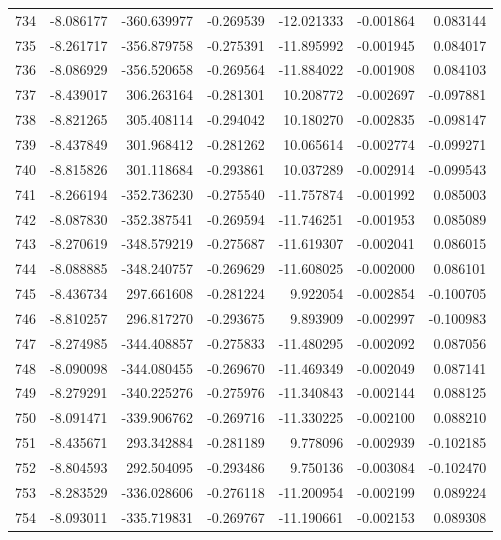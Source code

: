 \begin{tabular}{rrrrrrr}
 734 &  -8.086177 & -360.639977 & -0.269539 &  -12.021333 &   -0.001864 &  0.083144 \\
 735 &  -8.261717 & -356.879758 & -0.275391 &  -11.895992 &   -0.001945 &  0.084017 \\
 736 &  -8.086929 & -356.520658 & -0.269564 &  -11.884022 &   -0.001908 &  0.084103 \\
 737 &  -8.439017 &  306.263164 & -0.281301 &   10.208772 &   -0.002697 & -0.097881 \\
 738 &  -8.821265 &  305.408114 & -0.294042 &   10.180270 &   -0.002835 & -0.098147 \\
 739 &  -8.437849 &  301.968412 & -0.281262 &   10.065614 &   -0.002774 & -0.099271 \\
 740 &  -8.815826 &  301.118684 & -0.293861 &   10.037289 &   -0.002914 & -0.099543 \\
 741 &  -8.266194 & -352.736230 & -0.275540 &  -11.757874 &   -0.001992 &  0.085003 \\
 742 &  -8.087830 & -352.387541 & -0.269594 &  -11.746251 &   -0.001953 &  0.085089 \\
 743 &  -8.270619 & -348.579219 & -0.275687 &  -11.619307 &   -0.002041 &  0.086015 \\
 744 &  -8.088885 & -348.240757 & -0.269629 &  -11.608025 &   -0.002000 &  0.086101 \\
 745 &  -8.436734 &  297.661608 & -0.281224 &    9.922054 &   -0.002854 & -0.100705 \\
 746 &  -8.810257 &  296.817270 & -0.293675 &    9.893909 &   -0.002997 & -0.100983 \\
 747 &  -8.274985 & -344.408857 & -0.275833 &  -11.480295 &   -0.002092 &  0.087056 \\
 748 &  -8.090098 & -344.080455 & -0.269670 &  -11.469349 &   -0.002049 &  0.087141 \\
 749 &  -8.279291 & -340.225276 & -0.275976 &  -11.340843 &   -0.002144 &  0.088125 \\
 750 &  -8.091471 & -339.906762 & -0.269716 &  -11.330225 &   -0.002100 &  0.088210 \\
 751 &  -8.435671 &  293.342884 & -0.281189 &    9.778096 &   -0.002939 & -0.102185 \\
 752 &  -8.804593 &  292.504095 & -0.293486 &    9.750136 &   -0.003084 & -0.102470 \\
 753 &  -8.283529 & -336.028606 & -0.276118 &  -11.200954 &   -0.002199 &  0.089224 \\
 754 &  -8.093011 & -335.719831 & -0.269767 &  -11.190661 &   -0.002153 &  0.089308 \\

\end{tabular}
